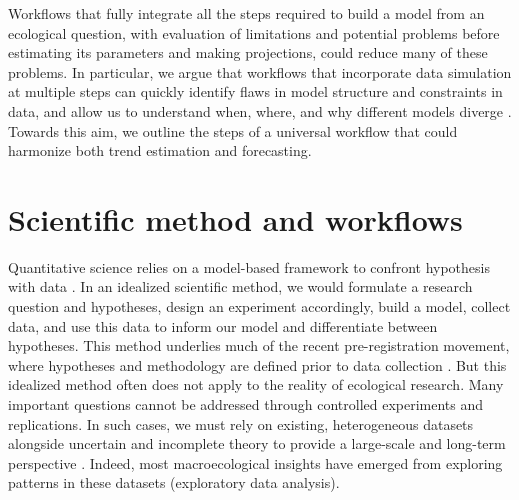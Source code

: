 \documentclass[11pt]{article}
\begin{document}
Workflows that fully integrate all the steps required to build a model from an ecological question, with evaluation of limitations and potential problems before estimating its parameters and making projections, could reduce many of these problems. In particular, we argue that workflows that incorporate data simulation at multiple steps can quickly identify flaws in model structure and constraints in data, and allow us to understand when, where, and why different models diverge \citep{McElreath2018, betanworkflow,Gelman2020,Schad2020,grinsztajn2021,vandeschoot2021,Wolkovich2024}. Towards this aim, we outline the steps of a universal workflow that could harmonize both trend estimation and forecasting.

\section{Scientific method and workflows}

Quantitative science relies on a model-based framework to confront hypothesis with data \citep{Chamberlin:1965cd}. In an idealized scientific method, we would formulate a research question and hypotheses, design an experiment accordingly, build a model, collect data, and use this data to inform our model and differentiate between hypotheses. This method underlies much of the recent pre-registration movement, where hypotheses and methodology are defined prior to data collection \citep{Nosek2018}.
But this idealized method often does not apply to the reality of ecological research. Many important questions cannot be addressed through controlled experiments and replications. In such cases, we must rely on existing, heterogeneous datasets alongside uncertain and incomplete theory to provide a large-scale and long-term perspective \citep{Hilborn1997}. Indeed, most macroecological insights have emerged from exploring patterns in these datasets (exploratory data analysis).
\end{document}
